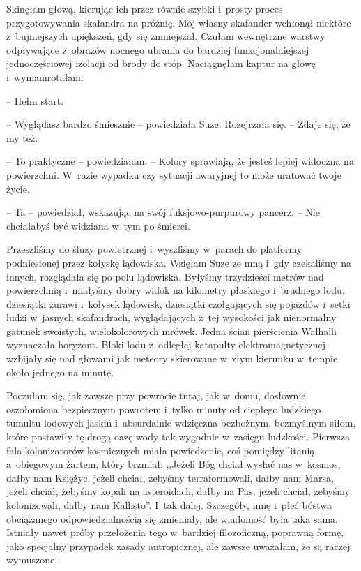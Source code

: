 \documentclass[oneside,polish,11pt,sfheadings]{mwbk}
\begin{document}
Skinęłam głową, kierując ich przez równie szybki i~prosty proces
przygotowywania skafandra na próżnię. Mój własny skafander wchłonął
niektóre z~bujniejszych upiększeń, gdy się zmniejszał. Czułam wewnętrzne
warstwy odpływające z~obrazów nocnego ubrania do bardziej
funkcjonalniejszej jednoczęściowej izolacji od brody do stóp.
Naciągnęłam kaptur na głowę i~wymamrotałam: 

-- Hełm start.

-- Wyglądasz bardzo śmiesznie -- powiedziała Suze. Rozejrzała się. -- Zdaje
się, że my też.

-- To praktyczne -- powiedziałam. -- Kolory sprawiają, że jesteś lepiej
widoczna na powierzchni. W~razie wypadku czy sytuacji awaryjnej to może
uratować twoje życie.

-- Ta -- powiedział, wskazując na swój fuksjowo-purpurowy pancerz. -- Nie
chciałabyś być widziana w~tym po śmierci.

Przeszliśmy do śluzy powietrznej i~wyszliśmy w~parach do platformy
podniesionej przez kołyskę lądowiska. Wzięłam Suze ze mną i~gdy
czekaliśmy na innych, rozglądała się po polu lądowiska. Byłyśmy
trzydzieści metrów nad powierzchnią i~miałyśmy dobry widok na kilometry
płaskiego i~brudnego lodu, dziesiątki żurawi i~kołysek lądowisk,
dziesiątki czołgających się pojazdów i~setki ludzi w~jasnych
skafandrach, wyglądających z~tej wysokości jak nienormalny gatunek
swoistych, wielokolorowych mrówek. Jedna ścian pierścienia Walhalli
wyznaczała horyzont. Bloki lodu z~odległej katapulty elektromagnetycznej
wzbijały się nad głowami jak meteory skierowane w~złym kierunku w~tempie
około jednego na minutę.

Poczułam się, jak zawsze przy powrocie tutaj, jak w~domu, dosłownie
oszołomiona bezpiecznym powrotem i~tylko minuty od ciepłego ludzkiego
tumultu lodowych jaskiń i~absurdalnie wdzięczna bezbożnym, bezmyślnym
siłom, które postawiły tę drogą oazę wody tak wygodnie w~zasięgu
ludzkości. Pierwsza fala kolonizatorów kosmicznych miała powiedzenie,
coś pomiędzy litanią a~obiegowym żartem, który brzmiał: ,,Jeżeli Bóg
chciał wysłać nas w~kosmos, dałby nam Księżyc, jeżeli chciał, żebyśmy
terraformowali, dałby nam Marsa, jeżeli chciał, żebyśmy kopali na
asteroidach, dałby na Pas, jeżeli chciał, żebyśmy kolonizowali, dałby
nam Kallisto''. I~tak dalej. Szczegóły, imię i~płeć bóstwa obciążanego
odpowiedzialnością się zmieniały, ale wiadomość była taka sama. Istniały
nawet próby przełożenia tego w~bardziej filozoficzną, poprawną formę,
jako specjalny przypadek zasady antropicznej, ale zawsze uważałam, że są
raczej wymuszone.
\end{document}
